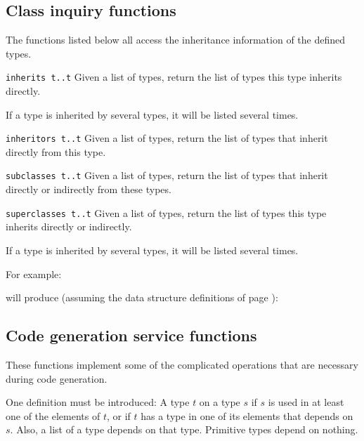 \subsection{Class inquiry functions}
The functions listed below all access the inheritance information
of the defined types.
\begin{desctab}
\item[\texttt{inherits t..t}]
Given a list of types, return the list of types this type inherits
directly.

If a type is inherited by several types, it will be listed several times.

\item[\texttt{inheritors t..t}]
Given a list of types, return the list of types that inherit directly
from this type.

\item[\texttt{subclasses t..t}]
Given a list of types, return the list of types that inherit directly
or indirectly from these types.

\item[\texttt{superclasses t..t}]
Given a list of types, return the list of types this type inherits
directly or indirectly.

If a type is inherited by several types, it will be listed several times.
\end{desctab}
For example:
\begin{showfile}

\end{showfile}
will produce (assuming the data structure definitions of page \pageref{plotds}):
\begin{showfile}

\end{showfile}

\subsection{Code generation service functions}
These functions implement some of the complicated operations that
are necessary during code generation. 

One definition must be introduced:
A type $t$  on a type $s$ if $s$
is used in at least one of the elements of $t$,
or if $t$ has a type in one of its elements that depends on $s$.
Also,
a list of a type depends on that type.
Primitive types depend on nothing.


